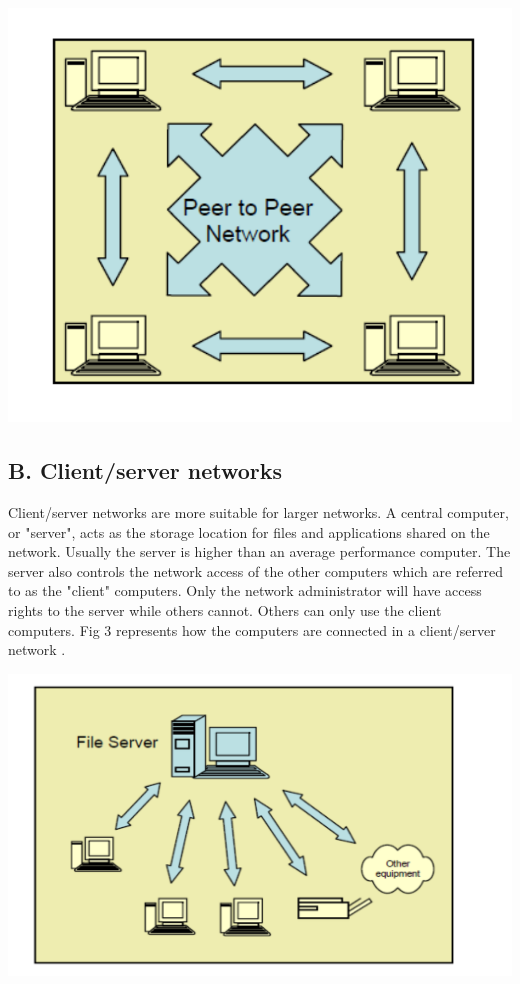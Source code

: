 \documentclass[12pt]{article}
\newenvironment{Figure}
  {\par\medskip\noindent\minipage{\linewidth}}
  {\endminipage\par\medskip}
\begin{document}
\begin{multicols*}{2}
\begin{Figure}
 \centering
 \includegraphics[width=\linewidth]{peer.png}
\end{Figure}

\subsection*{B. Client/server networks}
\indent \indent Client/server networks are more suitable for
larger networks. A central computer, or "server", acts as
the storage location for files and applications shared on
the network. Usually the server is higher than an
average performance computer. The server also controls
the network access of the other computers which are
referred to as the "client" computers. Only the network
administrator will have access rights to the server while
others cannot. Others can only use the client computers.
Fig 3 represents how the computers are connected in a
client/server network \cite{4}.

\begin{Figure}
 \centering
 \includegraphics[width=\linewidth]{client.png}
\end{Figure}


\end{multicols*}
\end{document}
